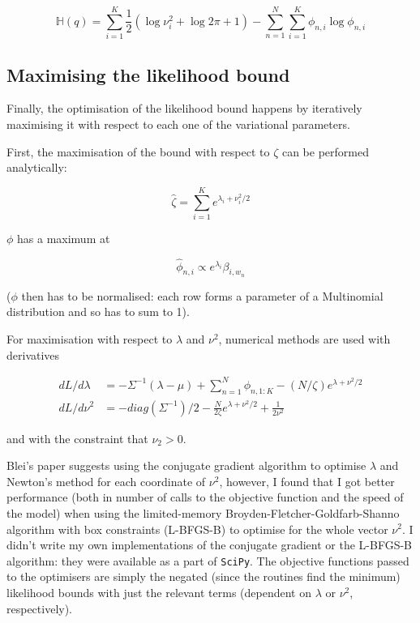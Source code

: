 \documentclass[12pt,a4paper,twoside,openright]{report}
\begin{document}
\begin{equation}
\mathbb{H}(q) = \sum\limits_{i=1}^K\frac{1}{2}(\log\nu_i^2 + \log 2 \pi + 1) - \sum\limits_{n=1}^N\sum\limits_{i=1}^K\phi_{n,i}\log\phi_{n,i}
\end{equation}

\subsection{Maximising the likelihood bound}

Finally, the optimisation of the likelihood bound happens by iteratively maximising it with respect to each one of the variational parameters.

First, the maximisation of the bound with respect to $\zeta$ can be performed analytically:

\begin{equation}
\hat\zeta = \sum\limits_{i=1}^Ke^{\lambda_i + \nu_i^2 / 2}
\end{equation}

$\phi$ has a maximum at

\begin{equation}
\hat\phi_{n, i} \propto e^{\lambda_i}\beta_{i, w_n} \label{eq:phiopt}
\end{equation}

($\phi$ then has to be normalised: each row forms a parameter of a Multinomial distribution and so has to sum to 1).

For maximisation with respect to $\lambda$ and $\nu^2$, numerical methods are used with derivatives

\begin{align}
dL/d\lambda & = -\Sigma^{-1}(\lambda - \mu) + \sum\limits_{n=1}^N\phi_{n, 1:K} - (N/\zeta)e^{\lambda + \nu^2/2} \\
dL/d\nu^2 & = -\mathit{diag}(\Sigma^{-1})/2 - \frac{N}{2\zeta}e^{\lambda + \nu^2/2} + \frac{1}{2\nu^2}
\end{align}

and with the constraint that $\nu_2 > 0$.

Blei's paper suggests using the conjugate gradient algorithm to optimise $\lambda$ and Newton's method for each coordinate of $\nu^2$, however, I found that I got better performance (both in number of calls to the objective function and the speed of the model) when using the limited-memory Broyden-Fletcher-Goldfarb-Shanno algorithm with box constraints (L-BFGS-B)\cite{doi:10.1137/0916069} to optimise for the whole vector $\nu^2$. I didn't write my own implementations of the conjugate gradient or the L-BFGS-B algorithm: they were available as a part of \texttt{SciPy}. The objective functions passed to the optimisers are simply the negated (since the routines find the minimum) likelihood bounds with just the relevant terms (dependent on $\lambda$ or $\nu^2$, respectively).
\end{document}
